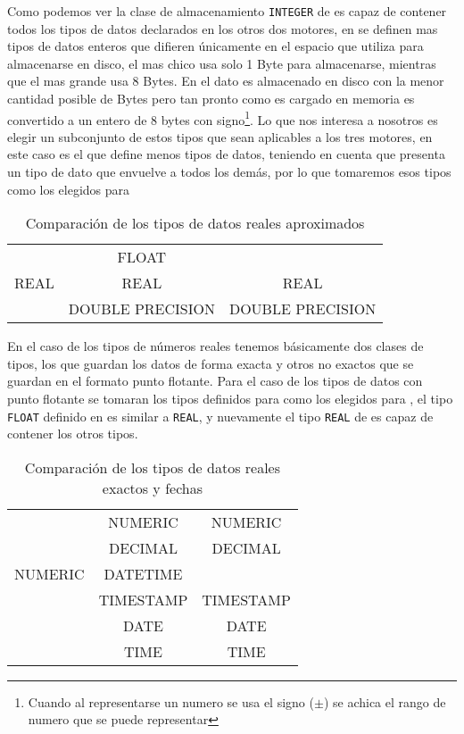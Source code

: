 Como podemos ver la clase de almacenamiento \verb=INTEGER= de \s es capaz de contener todos los tipos de datos declarados en los otros dos motores, en \m se definen mas tipos de datos enteros que  difieren únicamente en el espacio que utiliza para almacenarse en disco, el mas chico usa  solo 1 Byte para almacenarse, mientras que el mas grande usa 8 Bytes. En \s el dato es almacenado en disco con la menor cantidad posible de Bytes pero tan pronto como es cargado en memoria es convertido a un entero de 8 bytes con signo\footnote{Cuando al representarse un numero se usa el signo ($\pm$) se achica el rango de numero que se puede representar}. Lo que nos  interesa a nosotros es elegir un subconjunto de estos tipos que sean aplicables a los tres motores, en este caso es \p el que define menos tipos de datos, teniendo en cuenta que \s presenta un tipo de dato que envuelve a todos los demás, por lo que tomaremos esos tipos como los elegidos para \jj

\begin{table}[h]
\begin{center}
\begin{tabular}{|c|c|c|}
\hline \s   & \m               & \p \\  
\hline      & FLOAT            &  \\ 
       REAL & REAL             & REAL \\
            & DOUBLE PRECISION & DOUBLE PRECISION \\
\hline 
\end{tabular} 
\end{center}
\caption{Comparación de los tipos de datos reales aproximados}
\end{table}

En el caso de los tipos de números reales tenemos básicamente dos clases de tipos, los que guardan los datos de forma exacta y otros no exactos que se guardan en el formato punto flotante. Para el caso de los tipos de datos con punto flotante se tomaran los tipos definidos para \p como los elegidos para \jj, el tipo \verb=FLOAT= definido en \m es similar a \verb=REAL=, y nuevamente el tipo \verb=REAL= de \s es capaz de contener los otros tipos. 

\begin{table}[h]
\begin{center}
\begin{tabular}{|c|c|c|}
\hline \s & \m & \p \\  
\hline  & NUMERIC & NUMERIC \\
  & DECIMAL & DECIMAL \\
NUMERIC  & DATETIME &  \\
  & TIMESTAMP & TIMESTAMP \\
  & DATE & DATE \\
  & TIME & TIME \\  
\hline 
\end{tabular} 
\end{center}
\caption{Comparación de los tipos de datos reales exactos y fechas}
\end{table}

